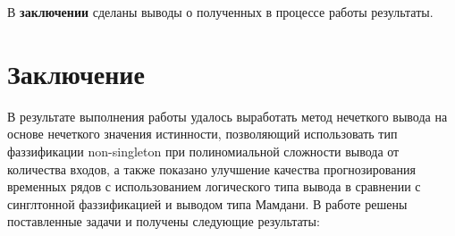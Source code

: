 В \textbf{заключении} сделаны выводы о полученных в процессе работы результаты.

\section*{Заключение}
В результате выполнения работы удалось выработать метод нечеткого вывода на основе нечеткого значения истинности, позволяющий использовать тип фаззификации non-singleton при полиномиальной сложности вывода от количества входов, а также показано улучшение качества прогнозирования временных рядов с использованием логического типа вывода в сравнении с синглтонной фаззификацией и выводом типа Мамдани. В работе решены поставленные задачи и получены следующие результаты:



